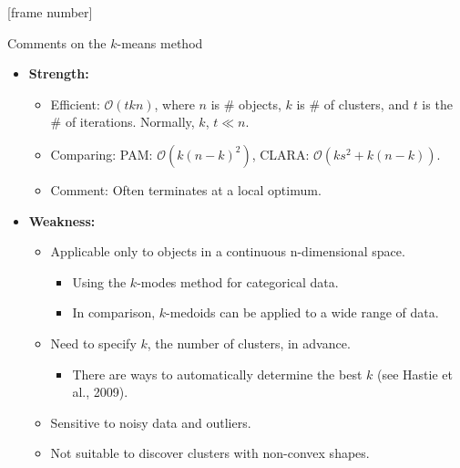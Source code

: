 \documentclass[aspectratio=169,t,xcolor=dvipsnames]{beamer}
\begin{document}
  {
    [frame number]
    \begin{frame}{Comments on the $k$-means method}
      \begin{itemize}
        \item \textbf{Strength:}
        \begin{itemize}
          \item Efficient: $\mathcal{O}(tkn)$, where $n$ is $\#$ objects, $k$ is $\#$ of clusters, and $t$ is the $\#$ of iterations. Normally, $k$, $t \ll n$.
          \item Comparing: PAM: $\mathcal{O}(k(n-k)^2)$, CLARA: $\mathcal{O}(ks^2 + k(n-k))$.
          \item Comment: Often terminates at a local optimum.
        \end{itemize}
        \item \textbf{Weakness:}
        \begin{itemize}
          \item Applicable only to objects in a continuous n-dimensional space.
          \begin{itemize}
            \item Using the $k$-modes method for categorical data.
            \item In comparison, $k$-medoids can be applied to a wide range of data.
          \end{itemize}
          \item Need to specify $k$, the number of clusters, in advance.
          \begin{itemize}
            \item There are ways to automatically determine the best $k$ (see Hastie et al., 2009).
          \end{itemize}
          \item Sensitive to noisy data and outliers.
          \item Not suitable to discover clusters with non-convex shapes.
        \end{itemize}
      \end{itemize}
    \end{frame}
  }
\end{document}
